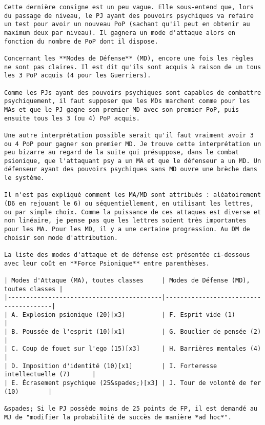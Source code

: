 \documentclass[11pt]{article}
\begin{document}
\begin{verbatim}
Cette dernière consigne est un peu vague. Elle sous-entend que, lors du passage de niveau, le PJ ayant des pouvoirs psychiques va refaire un test pour avoir un nouveau PoP (sachant qu'il peut en obtenir au maximum deux par niveau). Il gagnera un mode d'attaque alors en fonction du nombre de PoP dont il dispose.

Concernant les **Modes de Défense** (MD), encore une fois les règles ne sont pas claires. Il est dit qu'ils sont acquis à raison de un tous les 3 PoP acquis (4 pour les Guerriers).

Comme les PJs ayant des pouvoirs psychiques sont capables de combattre psychiquement, il faut supposer que les MDs marchent comme pour les MAs et que le PJ gagne son premier MD avec son premier PoP, puis ensuite tous les 3 (ou 4) PoP acquis.

Une autre interprétation possible serait qu'il faut vraiment avoir 3 ou 4 PoP pour gagner son premier MD. Je trouve cette interprétation un peu bizarre au regard de la suite qui présuppose, dans le combat psionique, que l'attaquant psy a un MA et que le défenseur a un MD. Un défenseur ayant des pouvoirs psychiques sans MD ouvre une brèche dans le système.

Il n'est pas expliqué comment les MA/MD sont attribués : aléatoirement (D6 en rejouant le 6) ou séquentiellement, en utilisant les lettres, ou par simple choix. Comme la puissance de ces attaques est diverse et non linéaire, je pense pas que les lettres soient très importantes pour les MA. Pour les MD, il y a une certaine progression. Au DM de choisir son mode d'attribution.

La liste des modes d'attaque et de défense est présentée ci-dessous avec leur coût en **Force Psionique** entre parenthèses.

| Modes d'Attaque (MA), toutes classes     | Modes de Défense (MD), toutes classes |
|------------------------------------------|---------------------------------------|
| A. Explosion psionique (20)[x3]          | F. Esprit vide (1)                    |
| B. Poussée de l'esprit (10)[x1]          | G. Bouclier de pensée (2)             |
| C. Coup de fouet sur l'ego (15)[x3]      | H. Barrières mentales (4)             |
| D. Imposition d'identité (10)[x1]        | I. Forteresse intellectuelle (7)      |
| E. Écrasement psychique (25&spades;)[x3] | J. Tour de volonté de fer (10)        |

&spades; Si le PJ possède moins de 25 points de FP, il est demandé au MJ de "modifier la probabilité de succès de manière *ad hoc*".


\end{verbatim}
\end{document}
